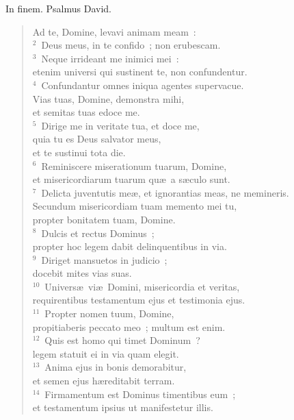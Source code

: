 \bchapter
\lettrine[lines=3,image=true,loversize=0.05,lraise=-0.03]{I}{}n finem. Psalmus David. \begin{flushleft}\begin{verse}\vspace{6pt}Ad te, Domine, levavi animam meam~:\\
${}^{2}$~Deus meus, in te confido~; non erubescam.\\
${}^{3}$~Neque irrideant me inimici mei~:\\ etenim universi qui sustinent te, non confundentur.\\
${}^{4}$~Confundantur omnes iniqua agentes supervacue.\\ Vias tuas, Domine, demonstra mihi,\\ et semitas tuas edoce me.\\
${}^{5}$~Dirige me in veritate tua, et doce me,\\ quia tu es Deus salvator meus,\\ et te sustinui tota die.\\
${}^{6}$~Reminiscere miserationum tuarum, Domine,\\ et misericordiarum tuarum qu\ae\ a s\ae culo sunt.\\
${}^{7}$~Delicta juventutis me\ae , et ignorantias meas, ne memineris.\\ Secundum misericordiam tuam memento mei tu,\\ propter bonitatem tuam, Domine.\\
${}^{8}$~Dulcis et rectus Dominus~;\\ propter hoc legem dabit delinquentibus in via.\\
${}^{9}$~Diriget mansuetos in judicio~;\\ docebit mites vias suas.\\
${}^{10}$~Univers\ae\ vi\ae\ Domini, misericordia et veritas,\\ requirentibus testamentum ejus et testimonia ejus.\\
${}^{11}$~Propter nomen tuum, Domine,\\ propitiaberis peccato meo~; multum est enim.\\
${}^{12}$~Quis est homo qui timet Dominum~?\\ legem statuit ei in via quam elegit.\\
${}^{13}$~Anima ejus in bonis demorabitur,\\ et semen ejus h\ae reditabit terram.\\
${}^{14}$~Firmamentum est Dominus timentibus eum~;\\ et testamentum ipsius ut manifestetur illis.\\

\end{verse}
\end{flushleft}
